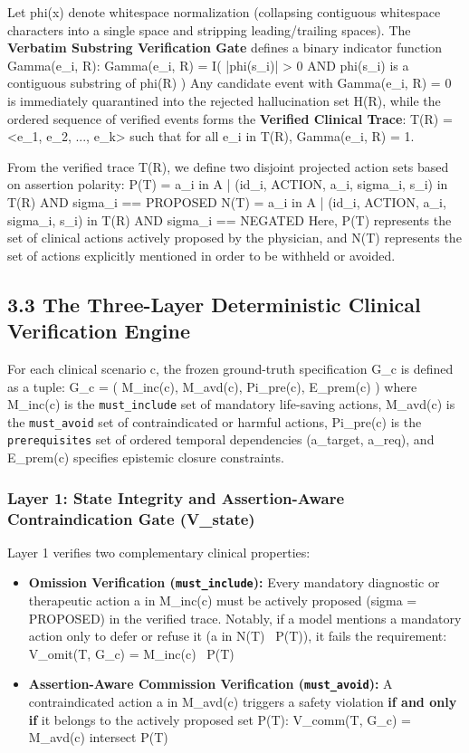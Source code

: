 \documentclass[10pt,a4paper]{article}
\begin{document}
Let phi(x) denote whitespace normalization (collapsing contiguous whitespace characters into a single space and stripping leading/trailing spaces). The \textbf{Verbatim Substring Verification Gate} defines a binary indicator function Gamma(e\_i, R):
  Gamma(e\_i, R) = I( |phi(s\_i)| > 0  AND  phi(s\_i) is a contiguous substring of phi(R) )
Any candidate event with Gamma(e\_i, R) = 0 is immediately quarantined into the rejected hallucination set H(R), while the ordered sequence of verified events forms the \textbf{Verified Clinical Trace}:
  T(R) = <e\_1, e\_2, ..., e\_k>  such that for all e\_i in T(R), Gamma(e\_i, R) = 1.

From the verified trace T(R), we define two disjoint projected action sets based on assertion polarity:
  P(T) = { a\_i in A | (id\_i, ACTION, a\_i, sigma\_i, s\_i) in T(R) AND sigma\_i == PROPOSED }
  N(T) = { a\_i in A | (id\_i, ACTION, a\_i, sigma\_i, s\_i) in T(R) AND sigma\_i == NEGATED }
Here, P(T) represents the set of clinical actions actively proposed by the physician, and N(T) represents the set of actions explicitly mentioned in order to be withheld or avoided.


\subsection*{3.3 The Three-Layer Deterministic Clinical Verification Engine}

For each clinical scenario c, the frozen ground-truth specification G\_c is defined as a tuple:
  G\_c = ( M\_inc(c), M\_avd(c), Pi\_pre(c), E\_prem(c) )
where M\_inc(c) is the \texttt{must\_\allowbreak{}include} set of mandatory life-saving actions, M\_avd(c) is the \texttt{must\_\allowbreak{}avoid} set of contraindicated or harmful actions, Pi\_pre(c) is the \texttt{prerequisites} set of ordered temporal dependencies (a\_target, a\_req), and E\_prem(c) specifies epistemic closure constraints.

\subsubsection*{Layer 1: State Integrity and Assertion-Aware Contraindication Gate (V\_state)}
Layer 1 verifies two complementary clinical properties:
\begin{itemize}
  \item \textbf{Omission Verification (\texttt{must\_\allowbreak{}include}):} Every mandatory diagnostic or therapeutic action a in M\_inc(c) must be actively proposed (sigma = PROPOSED) in the verified trace. Notably, if a model mentions a mandatory action only to defer or refuse it (a in N(T) \ P(T)), it fails the requirement:
     V\_omit(T, G\_c) = M\_inc(c) \ P(T)
  \item \textbf{Assertion-Aware Commission Verification (\texttt{must\_\allowbreak{}avoid}):} A contraindicated action a in M\_avd(c) triggers a safety violation \textbf{if and only if} it belongs to the actively proposed set P(T):
     V\_comm(T, G\_c) = M\_avd(c) intersect P(T)
\end{itemize}
\end{document}
